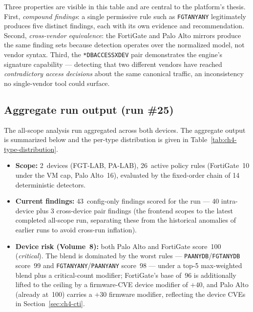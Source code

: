\documentclass[12pt,a4paper]{report}
\renewcommand{\_}{\textunderscore\allowbreak}
\begin{document}
Three properties are visible in this table and are central to the platform's thesis. First, \emph{compound findings}: a single permissive rule such as \texttt{FGT\_ANY\_ANY} legitimately produces five distinct findings, each with its own evidence and recommendation. Second, \emph{cross-vendor equivalence}: the FortiGate and Palo Alto mirrors produce the same finding sets because detection operates over the normalized model, not vendor syntax. Third, the \texttt{*\_DB\_ACCESS\_XDEV} pair demonstrates the engine's signature capability --- detecting that two different vendors have reached \emph{contradictory access decisions} about the same canonical traffic, an inconsistency no single-vendor tool could surface.

\subsection{Aggregate run output (run \#25)}

The all-scope analysis run aggregated across both devices. The aggregate output is summarized below and the per-type distribution is given in Table~\ref{tab:ch4-type-distribution}.

\begin{itemize}[leftmargin=1.4em]
  \item \textbf{Scope:} 2~devices (FGT-LAB, PA-LAB), 26~active policy rules (FortiGate~10 under the VM cap, Palo Alto~16), evaluated by the fixed-order chain of 14 deterministic detectors.
  \item \textbf{Current findings:} 43~config-only findings scored for the run --- 40 intra-device plus 3 cross-device pair findings (the frontend scopes to the latest completed all-scope run, separating these from the historical anomalies of earlier runs to avoid cross-run inflation).
  \item \textbf{Device risk (Volume~8):} both Palo Alto and FortiGate score~100 (\emph{critical}). The blend is dominated by the worst rules --- \texttt{PA\_ANY\_DB}/\texttt{FGT\_ANY\_DB} score~99 and \texttt{FGT\_ANY\_ANY}/\texttt{PA\_ANY\_ANY} score~98 --- under a top-5 max-weighted blend plus a critical-count modifier; FortiGate's base of~96 is additionally lifted to the ceiling by a firmware-CVE device modifier of $+40$, and Palo Alto (already at~100) carries a $+30$ firmware modifier, reflecting the device CVEs in Section~\ref{sec:ch4-cti}.
\end{itemize}
\end{document}
